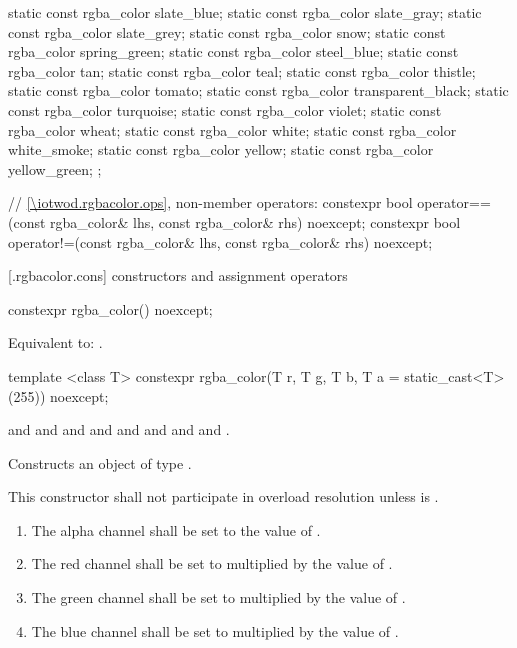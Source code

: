 \begin{codeblock}
{{    static const rgba_color slate_blue;
    static const rgba_color slate_gray;
    static const rgba_color slate_grey;
    static const rgba_color snow;
    static const rgba_color spring_green;
    static const rgba_color steel_blue;
    static const rgba_color tan;
    static const rgba_color teal;
    static const rgba_color thistle;
    static const rgba_color tomato;
    static const rgba_color transparent_black;
    static const rgba_color turquoise;
    static const rgba_color violet;
    static const rgba_color wheat;
    static const rgba_color white;
    static const rgba_color white_smoke;
    static const rgba_color yellow;
    static const rgba_color yellow_green;
  };

  // \ref{\iotwod.rgbacolor.ops}, non-member operators:
  constexpr bool operator==(const rgba_color& lhs, const rgba_color& rhs) 
    noexcept;
  constexpr bool operator!=(const rgba_color& lhs, const rgba_color& rhs) 
    noexcept;
}
\end{codeblock}

 [\iotwod.rgbacolor.cons] { constructors and assignment operators}

\begin{itemdecl}
constexpr rgba_color() noexcept;
\end{itemdecl}
\begin{itemdescr}
\pnum
\effects
Equivalent to: .
\end{itemdescr}

\begin{itemdecl}
template <class T>
constexpr rgba_color(T r, T g, T b, T a = static_cast<T>(255)) noexcept;
\end{itemdecl}
\begin{itemdescr}
\pnum
\requires
{} and  and  and  and  and  and  and  and .

\pnum
\effects
Constructs an object of type .

\pnum
\remarks
This constructor shall not participate in overload resolution unless  is .
\begin{enumerate}
\item The alpha channel shall be set to the value of .
\item The red channel shall be set to  multiplied by the value of  .
\item The green channel shall be set to  multiplied by the value of .
\item The blue channel shall be set to  multiplied by the value of .
\end{enumerate}
\end{itemdescr}

